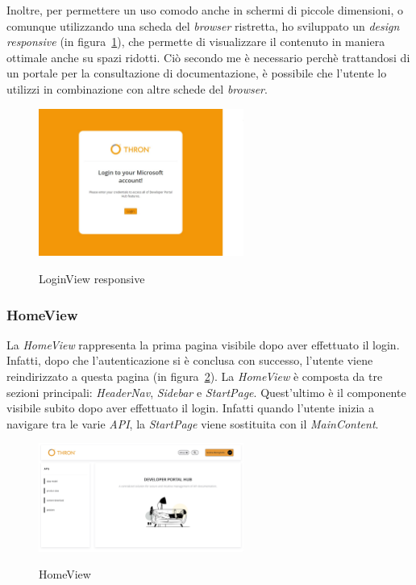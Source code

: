 Inoltre, per permettere un uso comodo anche in schermi di piccole dimensioni, o comunque utilizzando una scheda del \textit{browser} ristretta, ho sviluppato
un \textit{design responsive} (in figura~\ref{fig:login-view-responsive}), che permette di visualizzare il contenuto in maniera ottimale anche su spazi ridotti.
Ciò secondo me è necessario perchè trattandosi di un portale per la consultazione di documentazione, è possibile che l'utente 
lo utilizzi in combinazione con altre schede del \textit{browser}.

\begin{figure}[ht]
  \centering
  \includegraphics[width=0.6\textwidth, alt={Pagina di login responsive dell'applicazione}]{images/frontend/LoginViewRes.jpg}
  \caption{LoginView responsive}\label{fig:login-view-responsive}
\end{figure}
\pagebreak

\subsubsection{HomeView}\label{subsubsec:home-view}
La \textit{HomeView} rappresenta la prima pagina visibile dopo aver effettuato il login. Infatti, dopo che l'autenticazione si è conclusa con successo,
l'utente viene reindirizzato a questa pagina (in figura~\ref{fig:home-view}).
La \textit{HomeView} è composta da tre sezioni principali: \textit{HeaderNav}, \textit{Sidebar} e \textit{StartPage}. Quest'ultimo è il componente visibile 
subito dopo aver effettuato il login. Infatti quando l'utente inizia a navigare tra le varie \textit{API}, la \textit{StartPage} viene sostituita con il \textit{MainContent}.

\begin{figure}[ht]
  \centering
  \includegraphics[width=0.6\textwidth, alt={Pagina principale dell'applicazione}]{images/frontend/HomeView.jpg}
  \caption{HomeView}\label{fig:home-view}
\end{figure}

